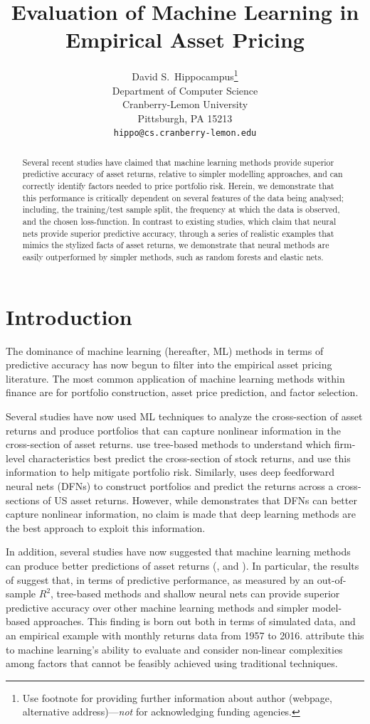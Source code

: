 \documentclass{article}
\title{Evaluation of Machine Learning in Empirical Asset Pricing}
\author{%
  David S.~Hippocampus\thanks{Use footnote for providing further information
    about author (webpage, alternative address)---\emph{not} for acknowledging
    funding agencies.} \\
  Department of Computer Science\\
  Cranberry-Lemon University\\
  Pittsburgh, PA 15213 \\
  \texttt{hippo@cs.cranberry-lemon.edu} \\
}
\begin{document}
\maketitle

\begin{abstract}
	Several recent studies have claimed that machine learning methods provide superior predictive accuracy of asset returns, relative to simpler modelling approaches, and can correctly identify factors needed to price portfolio risk. Herein, we demonstrate that this performance is critically dependent on several features of the data being analysed; including, the training/test sample split, the frequency at which the data is observed, and the chosen loss-function. In contrast to existing studies, which claim that neural nets provide superior predictive accuracy, through a series of realistic examples that mimics the stylized facts of asset returns, we demonstrate that neural methods are easily outperformed by simpler methods, such as random forests and elastic nets.
\end{abstract}

\section{Introduction}
The dominance of machine learning (hereafter, ML) methods in terms of predictive accuracy has now begun to filter into the empirical asset pricing literature. The most common application of machine learning methods within finance are for portfolio construction, asset price prediction, and factor selection. 

Several studies have now used ML techniques to analyze the cross-section of asset returns and produce portfolios that can capture nonlinear information in the cross-section of asset returns. \cite{moritz2016tree} use tree-based methods to understand which firm-level characteristics best predict the cross-section of stock returns, and use this information to help mitigate portfolio risk. Similarly, \cite{messmer2017deep} uses deep feedforward neural nets (DFNs) to construct portfolios and predict the returns across a cross-sections of US asset returns. However, while \cite{messmer2017deep} demonstrates that DFNs can better capture nonlinear information, no claim is made that deep learning methods are the best approach to exploit this information. 

In addition, several studies have now suggested that machine learning methods can produce better predictions of asset returns (\cite{gu_empirical_2018}, \cite{hsu_finding_2014} and \cite{feng_deep_2018}). In particular, the results of \cite{gu_empirical_2018} suggest that, in terms of predictive performance, as measured by an out-of-sample $R^2$,  tree-based methods and shallow neural nets can provide superior predictive accuracy over other machine learning methods and simpler model-based approaches. This finding is born out both in terms of simulated data, and an empirical example with monthly returns data from 1957 to 2016. \cite{gu_empirical_2018} attribute this to machine learning's ability to evaluate and consider non-linear complexities among factors that cannot be feasibly achieved using traditional techniques. 
\end{document}
